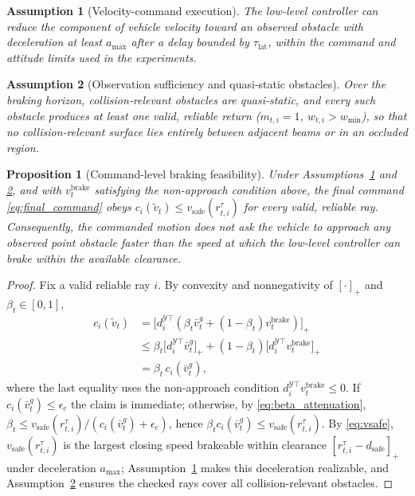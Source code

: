 \documentclass[11pt]{article}
\newtheorem{assumption}{Assumption}
\newtheorem{proposition}{Proposition}
\begin{document}
\begin{assumption}[Velocity-command execution]
The low-level controller can reduce the component of vehicle velocity toward an
observed obstacle with deceleration at least $a_{\max}$ after a delay bounded by
$\tau_{\mathrm{lat}}$, within the command and attitude limits used in the
experiments.
\label{assumption:execution}
\end{assumption}

\begin{assumption}[Observation sufficiency and quasi-static obstacles]
Over the braking horizon, collision-relevant obstacles are quasi-static, and
every such obstacle produces at least one valid, reliable return
($m_{t,i}=1$, $w_{t,i}>w_{\min}$), so that no collision-relevant surface lies
entirely between adjacent beams or in an occluded region.
\label{assumption:observation}
\end{assumption}

\begin{proposition}[Command-level braking feasibility]
Under Assumptions~\ref{assumption:execution} and \ref{assumption:observation},
and with $v^{\mathrm{brake}}_t$ satisfying the non-approach condition above, the
final command \eqref{eq:final_command} obeys
$c_i(\tilde v_t) \leq v_{\mathrm{safe}}(r^{\tau}_{t,i})$ for every valid,
reliable ray. Consequently, the commanded motion does not ask the vehicle to
approach any observed point obstacle faster than the speed at which the
low-level controller can brake within the available clearance.
\label{prop:command_feasibility}
\end{proposition}

\begin{proof}
Fix a valid reliable ray $i$. By convexity and nonnegativity of $[\cdot]_+$ and
$\beta_t\in[0,1]$,
\begin{align*}
    c_i(\tilde v_t)
    &= \bigl[d_i^{\mathcal{Y}\top}(\beta_t \bar v^g_t
       + (1-\beta_t)v^{\mathrm{brake}}_t)\bigr]_+ \\
    &\leq \beta_t\bigl[d_i^{\mathcal{Y}\top}\bar v^g_t\bigr]_+
       + (1-\beta_t)\bigl[d_i^{\mathcal{Y}\top}v^{\mathrm{brake}}_t\bigr]_+ \\
    &= \beta_t\, c_i(\bar v^g_t),
\end{align*}
where the last equality uses the non-approach condition
$d_i^{\mathcal{Y}\top}v^{\mathrm{brake}}_t\le 0$. If
$c_i(\bar v^g_t)\le\epsilon_c$ the claim is immediate; otherwise, by
\eqref{eq:beta_attenuation},
$\beta_t \le v_{\mathrm{safe}}(r^{\tau}_{t,i})/(c_i(\bar v^g_t)+\epsilon_c)$,
hence $\beta_t c_i(\bar v^g_t) \le v_{\mathrm{safe}}(r^{\tau}_{t,i})$. By
\eqref{eq:vsafe}, $v_{\mathrm{safe}}(r^{\tau}_{t,i})$ is the largest closing
speed brakeable within clearance $[r^{\tau}_{t,i}-d_{\mathrm{safe}}]_+$ under
deceleration $a_{\max}$; Assumption~\ref{assumption:execution} makes this
deceleration realizable, and Assumption~\ref{assumption:observation} ensures the
checked rays cover all collision-relevant obstacles.
\end{proof}
\end{document}
